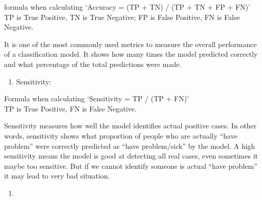 \documentclass[
  11pt,
  letterpaper,
  DIV=11,
  numbers=noendperiod]{scrartcl}
\providecommand{\tightlist}{%
  \setlength{\itemsep}{0pt}\setlength{\parskip}{0pt}}\usepackage{longtable,booktabs,array}
\begin{document}
formula when calculating `Accuracy = (TP + TN) / (TP + TN + FP + FN)' TP
is True Positive, TN is True Negative; FP is False Positive, FN is False
Negative.

It is one of the most commonly used metrics to measure the overall
performance of a classification model. It shows how many times the model
predicted correctly and what percentage of the total predictions were
made.

\begin{enumerate}
\def\labelenumi{\arabic{enumi}.}
\setcounter{enumi}{1}
\tightlist
\item
  Sensitivity:
\end{enumerate}

Formula when calculating `Sensitivity = TP / (TP + FN)'\\
TP is True Positive, FN is False Negative.

Sensitivity measures how well the model identifies actual positive
cases. In other words, sensitivity shows what proportion of people who
are actually ``have problem'' were correctly predicted as ``have
problem/sick'' by the model. A high sensitivity means the model is good
at detecting all real cases, even sometimes it maybe too sensitive. But
if we cannot identify someone is actual ``have problem'' it may lead to
very bad situation.

\begin{enumerate}
\def\labelenumi{(\arabic{enumi})}
\setcounter{enumi}{10}
\tightlist
\item
\end{enumerate}
\end{document}
